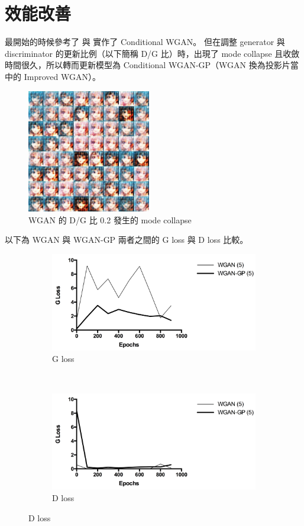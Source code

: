 \documentclass[final,3p]{elsarticle}
\begin{document}
\section{效能改善}
	最開始的時候參考了 \cite{jiamings91:online} 與 \cite{zhangqia0:online} 實作了 Conditional WGAN。
	但在調整 generator 與 discriminator 的更新比例（以下簡稱 D/G 比）時，出現了 mode collapse 且收斂時間很久，所以轉而更新模型為 Conditional WGAN-GP（WGAN 換為投影片當中的 Improved WGAN）。
	\begin{figure}[H]
		\centering
		\includegraphics[width=0.48\textwidth]{images/wgan_d1_g5_900}
		\caption{WGAN 的 D/G 比 0.2 發生的 mode collapse} 
	\end{figure}
	
	
	以下為 WGAN 與 WGAN-GP 兩者之間的 G loss 與 D loss 比較。
	\begin{figure}[H]
		\centering
		\begin{subfigure}{.48\textwidth}
			\centering
			\includegraphics[width=\linewidth]{images/g_loss_wgangp}
			\caption{G loss}
		\end{subfigure}
		~
		\begin{subfigure}{.48\textwidth}
			\centering
			\includegraphics[width=\linewidth]{images/d_loss_wgangp}
			\caption{D loss}
		\end{subfigure}
		\label{fig:dg_gd_loss}
	\end{figure}
\end{document}
